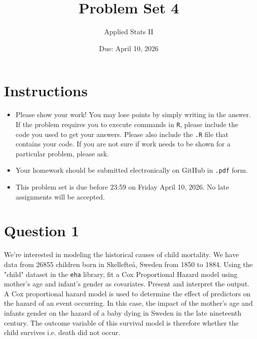 \documentclass[12pt,letterpaper]{article}
\title{Problem Set 4}
\date{Due: April 10, 2026}
\author{Applied Stats II}
\begin{document}
	\maketitle
	\section*{Instructions}
	\begin{itemize}
	\item Please show your work! You may lose points by simply writing in the answer. If the problem requires you to execute commands in \texttt{R}, please include the code you used to get your answers. Please also include the \texttt{.R} file that contains your code. If you are not sure if work needs to be shown for a particular problem, please ask.
	\item Your homework should be submitted electronically on GitHub in \texttt{.pdf} form.
	\item This problem set is due before 23:59 on Friday April 10, 2026. No late assignments will be accepted.

	\end{itemize}

	\vspace{.25cm}
\section*{Question 1}
\vspace{.25cm}
\noindent We're interested in modeling the historical causes of child mortality. We have data from 26855 children born in Skellefteå, Sweden from 1850 to 1884. Using the "child" dataset in the \texttt{eha} library, fit a Cox Proportional Hazard model using mother's age and infant's gender as covariates. Present and interpret the output. \\


A Cox proportional hazard model is used to determine the effect of predictors on the hazard of an event occurring. In this case, the impact of the mother's age and infants gender on the hazard of a baby dying in Sweden in the late nineteenth century. The outcome variable of this survival model is therefore whether the child survives i.e. death did not occur. 


	 
	
\end{document}

